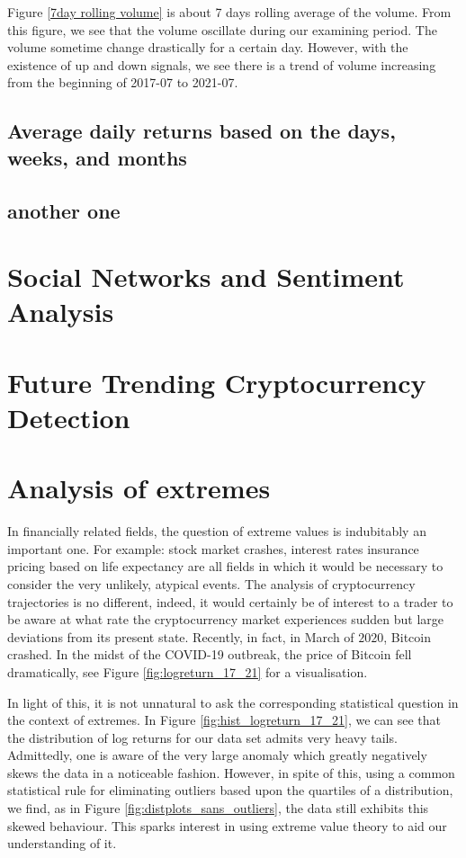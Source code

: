 \documentclass[twoside]{report}
\begin{document}
\begin{spacing}{1}
Figure \ref{7day rolling volume} is about 7 days rolling average of the volume. From this figure, we see that the volume oscillate during our examining period. The volume sometime change drastically for a certain day. However, with the existence of up and down signals, we see there is a trend of volume increasing from the beginning of 2017-07 to 2021-07.

\subsection{Average daily returns based on the days, weeks, and months}

\subsection{another one}

\section{Social Networks and Sentiment Analysis}

\section{Future Trending Cryptocurrency Detection }

\section{Analysis of extremes}

In financially related fields, the question of extreme values is indubitably an important one. For example: stock market crashes, interest rates  insurance pricing based on life expectancy are all fields in which it would be necessary to consider the very unlikely, atypical events. The analysis of cryptocurrency trajectories is no different, indeed, it would certainly be of interest to a trader to be aware at what rate the cryptocurrency market experiences sudden but large deviations from its present state. Recently, in fact, in March of $2020$, Bitcoin crashed. In the midst of the COVID-19 outbreak, the price of Bitcoin fell dramatically, see Figure \ref{fig:logreturn_17_21} for a visualisation.



In light of this, it is not unnatural to ask the corresponding statistical question in the context of extremes. In Figure \ref{fig:hist_logreturn_17_21}, we can see that the distribution of log returns for our data set admits very heavy tails. Admittedly, one is aware of the very large anomaly which greatly negatively skews the data in a noticeable fashion. However, in spite of this, using a common statistical rule for eliminating outliers based upon the quartiles of a distribution, we find, as in Figure \ref{fig:distplots_sans_outliers}, the data still exhibits this skewed behaviour. This sparks interest in using extreme value theory to aid our understanding of it.\\


\end{spacing}
\end{document}
